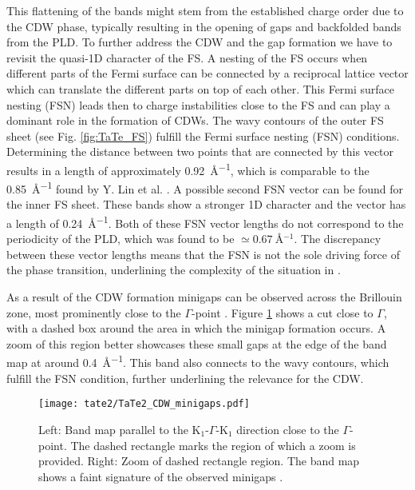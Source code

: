This flattening of the bands might stem from the established charge order due to the CDW phase, typically resulting in the opening of gaps and backfolded bands from the PLD.
To further address the CDW and the gap formation we have to revisit the quasi-1D character of the FS.
A nesting of the FS occurs when different parts of the Fermi surface can be connected by a reciprocal lattice vector which can translate the different parts on top of each other.
This Fermi surface nesting (FSN) leads then to charge instabilities close to the FS and can play a dominant role in the formation of CDWs.
The wavy contours of the outer FS sheet (see Fig. \ref{fig:TaTe_FS}) fulfill the Fermi surface nesting (FSN) conditions.
Determining the distance between two points that are connected by this vector results in a length of approximately \SI{0.92}{\angstrom^{-1}}, which is comparable to the \SI{0.85}{\angstrom^{-1}} found by Y. Lin et al. \cite{lin_evidence_2022}.
A possible second FSN vector can be found for the inner FS sheet.
These bands show a stronger 1D character and the vector has a length of \SI{0.24}{\angstrom^{-1}}.
Both of these FSN vector lengths do not correspond to the periodicity of the PLD, which was found to be $\simeq\SI{0.67}{\angstrom^{-1}}$.
The discrepancy between these vector lengths means that the FSN is not the sole driving force of the phase transition, underlining the complexity of the situation in .

As a result of the CDW formation minigaps can be observed across the Brillouin zone, most prominently close to the $\Gamma$-point \cite{lin_evidence_2022}.
Figure \ref{fig:TaTe_minigaps} shows a cut close to $\Gamma$, with a dashed box around the area in which the minigap formation occurs.
A zoom of this region better showcases these small gaps at the edge of the band map at around \SI{0.4}{\angstrom^{-1}}.
This band also connects to the wavy contours, which fulfill the FSN condition, further underlining the relevance for the CDW.

\begin{figure}[h!]
	\centering
	\texttt{[image: tate2/TaTe2\_CDW\_minigaps.pdf]}
	\caption{Left: Band map parallel to the K$_1$-$\Gamma$-K$_1$ direction close to the $\Gamma$-point. The dashed rectangle marks the region of which a zoom is provided. Right: Zoom of dashed rectangle region. The band map shows a faint signature of the observed minigaps \cite{lin_evidence_2022}.}
	\label{fig:TaTe_minigaps}
\end{figure}

